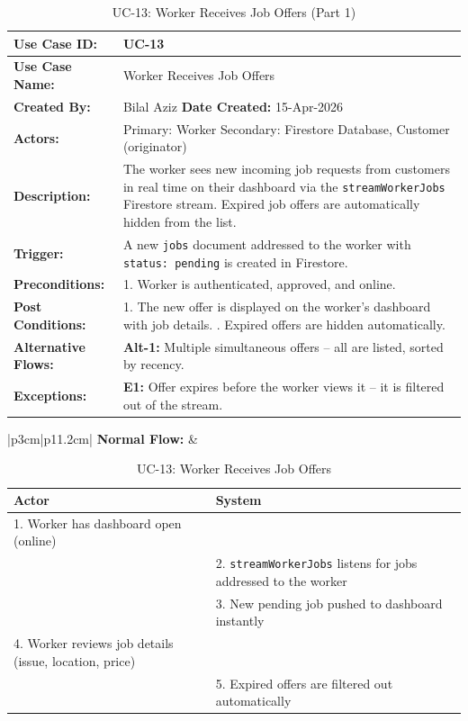{\small
\renewcommand{\arraystretch}{1.05}
\begin{table}[H]
\centering
\begin{tabular}{|p{3cm}|p{11.2cm}|}
\hline
\textbf{Use Case ID:} & UC-13 \\ \hline
\textbf{Use Case Name:} & Worker Receives Job Offers \\ \hline
\textbf{Created By:} & Bilal Aziz \hfill \textbf{Date Created:} 15-Apr-2026 \\ \hline
\textbf{Actors:} & Primary: Worker \quad Secondary: Firestore Database, Customer (originator) \\ \hline
\textbf{Description:} & The worker sees new incoming job requests from customers in real time on their dashboard via the \texttt{streamWorkerJobs} Firestore stream. Expired job offers are automatically hidden from the list. \\ \hline
\textbf{Trigger:} & A new \texttt{jobs} document addressed to the worker with \texttt{status: pending} is created in Firestore. \\ \hline
\textbf{Preconditions:} & 1. Worker is authenticated, approved, and online. \\ \hline
\textbf{Post Conditions:} & 1. The new offer is displayed on the worker's dashboard with job details. \newline 2. Expired offers are hidden automatically. \\ \hline
\textbf{Alternative Flows:} & \textbf{Alt-1:} Multiple simultaneous offers -- all are listed, sorted by recency. \\ \hline
\textbf{Exceptions:} & \textbf{E1:} Offer expires before the worker views it -- it is filtered out of the stream. \\ \hline
\end{tabular}
\caption*{UC-13: Worker Receives Job Offers (Part 1)}
\end{table}
}

\newpage

{\small
\renewcommand{\arraystretch}{1.05}
\begin{table}[H]
\centering
\begin{tabular}{|p{3cm}|p{11.2cm}|}
\hline
\textbf{Normal Flow:} &
\begin{tabular}[t]{|p{5.4cm}|p{5.4cm}|}
\hline
\textbf{Actor} & \textbf{System} \\ \hline
1. Worker has dashboard open (online) & \\ \hline
 & 2. \texttt{streamWorkerJobs} listens for jobs addressed to the worker \\ \hline
 & 3. New pending job pushed to dashboard instantly \\ \hline
4. Worker reviews job details (issue, location, price) & \\ \hline
 & 5. Expired offers are filtered out automatically \\ \hline
\end{tabular} \\ \hline
\end{tabular}
\caption{UC-13: Worker Receives Job Offers}
\end{table}
}

